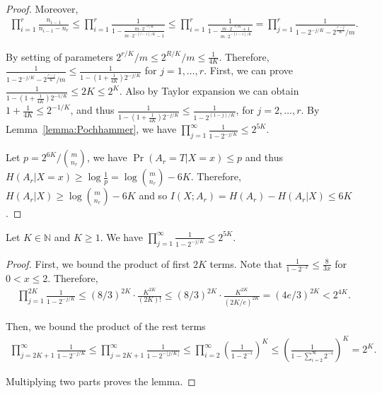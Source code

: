 \begin{proof}
  Moreover, 
  \begin{align}
    \prod_{i=1}^{r} \frac{n_{i-1}}{n_{i-1}-n_r}
    \le\prod_{i=1}^{r} \frac{1}{1-\frac{m\cdot 2^{-r/K}}{m\cdot 2^{-(i-1)/K}-1}}
    \le\prod_{i=1}^{r} \frac{1}{1-\frac{m\cdot 2^{-r/K}+1}{m\cdot 2^{-(i-1)/K}}}
    =\prod_{j=1}^{r} \frac{1}{1-2^{-j/K}-2^{\frac{r-j}{K}}/m}.
  \end{align}
  
  By setting of parameters $2^{r/K}/m \le 2^{R/K}/m \le \frac{1}{4K}$.
  Therefore, $\frac{1}{1-2^{-j/K}-2^{\frac{r-j}{K}}/m}\le \frac{1}{1-(1+\frac{1}{4K})2^{-j/K}}$ for $j=1,\ldots,r$.
  First, we can prove $\frac{1}{1-(1+\frac{1}{4K})2^{-1/K}}\le 2K \le 2^K$. 
  Also by Taylor expansion we can obtain $1+\frac{1}{4K}\le 2^{-1/K}$, and thus $\frac{1}{1-(1+\frac{1}{4K})2^{-j/K}}\le \frac{1}{1-2^{(1-j)/K}}$, for $j=2,\ldots, r$. 
  By Lemma~\ref{lemma:Pochhammer}, we have $\prod_{j=1}^{\infty} \frac{1}{1-2^{-j/K}}\le 2^{5K}$. 
  
  Let $p={2^{6K}}/{{m\choose n_r}}$, we have $\Pr(A_r=T|X=x)\le p$ and thus $H(A_r|X=x)\ge \log\frac{1}{p}=\log{{m\choose n_r}}-6K$. Therefore, $H(A_r|X)\ge \log{{m\choose n_r}}-6K$ and so $I(X;A_r)=H(A_r)-H(A_r|X)\le 6K$.  
\end{proof}

\begin{lemma}\label{lemma:Pochhammer}
  Let $K\in \mathbb{N}$ and $K\ge 1$. We have $\prod_{j=1}^{\infty} \frac{1}{1-2^{-j/K}}\le 2^{5K}$.
\end{lemma}

\begin{proof}
  First, we bound the product of first $2K$ terms. Note that $\frac{1}{1-2^{-x}}\le \frac{8}{3x}$ for $0<x\le 2$. Therefore, 
  \begin{align}
    \prod_{j=1}^{2K}\frac{1}{1-2^{-j/K}}
    \le (8/3)^{2K}\cdot \frac{K^{2K}}{(2K)!}
    \le (8/3)^{2K}\cdot \frac{K^{2K}}{(2K/e)^{2K}}
    = (4e/3)^{2K}
    < 2^{4K}. 
  \end{align}
  
  Then, we bound the product of the rest terms
  \begin{align}
    \prod_{j=2K+1}^{\infty}\frac{1}{1-2^{-j/K}} 
    \le \prod_{j=2K+1}^{\infty}\frac{1}{1-2^{-\lfloor j/K \rfloor}} 
    \le \prod_{i=2}^{\infty}\left( \frac{1}{1-2^{-i}}\right)^K 
    \le \left( \frac{1}{1-\sum_{i=2}^{\infty}2^{-i}}\right)^K
    = 2^K.
  \end{align}
  
  Multiplying two parts proves the lemma.
\end{proof}

